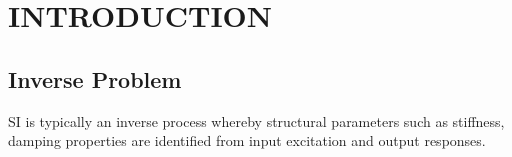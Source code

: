 \documentclass[BTech]{srmuthesis}
\begin{document}
\pagebreak
\clearpage



\chapter{INTRODUCTION}
\label{chap:intro}
\section{Inverse Problem}

 \ac{SI} is typically an inverse process whereby structural parameters such as stiffness, damping properties are identified from input excitation and output responses.
 
\end{document}
